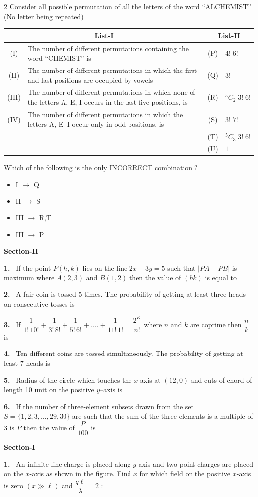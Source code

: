 \documentclass[10pt]{extarticle}
\newcommand{\papersec}[1]{\par\bigskip{\centering\Large\bfseries PAPER-#1\par}\medskip}
\newcommand{\partsec}[2]{\par\medskip\noindent{\large\bfseries PART-#1: #2}\par\smallskip}
\newcommand{\sect}[1]{\par\smallskip\noindent\textbf{#1}\par}
\newcommand{\qn}[1]{\par\smallskip\noindent\textbf{#1.}~}
\newenvironment{qoptions}{\begin{itemize}[leftmargin=1.8em,itemsep=1pt,topsep=2pt,label={}]}{\end{itemize}}
\newcommand{\opt}[2]{\item[(#1)] #2}
\begin{document}
\begin{multicols}{2}
Consider all possible permutation of all the letters of the word ``ALCHEMIST'' (No letter being repeated)
\begin{center}\small\setlength{\tabcolsep}{3pt}
\begin{tabular}{|c|p{3.7cm}|c|p{2.3cm}|}
\hline
\multicolumn{2}{|c|}{List-I} & \multicolumn{2}{c|}{List-II}\\ \hline
(I) & The number of different permutations containing the word ``CHEMIST'' is & (P) & $4!\;6!$\\ \hline
(II) & The number of different permutations in which the first and last positions are occupied by vowels & (Q) & $3!$\\ \hline
(III) & The number of different permutations in which none of the letters A, E, I occurs in the last five positions, is & (R) & $^5C_2\;3!\;6!$\\ \hline
(IV) & The number of different permutations in which the letters A, E, I occur only in odd positions, is & (S) & $3!\;7!$\\ \hline
 & & (T) & $^5C_3\;3!\;6!$\\ \hline
 & & (U) & $1$\\ \hline
\end{tabular}
\end{center}
Which of the following is the only INCORRECT combination ?
\begin{qoptions}
\opt{A}{I $\to$ Q}
\opt{B}{II $\to$ S}
\opt{C}{III $\to$ R,T}
\opt{D}{III $\to$ P}
\end{qoptions}
\sect{Section-II}
\qn{1} If the point $P(h,k)$ lies on the line $2x+3y=5$ such that $|PA-PB|$ is maximum where $A(2,3)$ and $B(1,2)$ then the value of $(hk)$ is equal to
\qn{2} A fair coin is tossed 5 times. The probability of getting at least three heads on consecutive tosses is
\qn{3} If $\dfrac{1}{1!\,10!}+\dfrac{1}{3!\,8!}+\dfrac{1}{5!\,6!}+\ldots.+\dfrac{1}{11!\,1!}=\dfrac{2^K}{n!}$ where $n$ and $k$ are coprime then $\dfrac{n}{k}$ is
\qn{4} Ten different coins are tossed simultaneously. The probability of getting at least 7 heads is
\qn{5} Radius of the circle which touches the $x$-axis at $(12,0)$ and cuts of chord of length 10 unit on the positive $y$--axis is
\qn{6} If the number of three-element subsets drawn from the set $S=\{1,2,3,\ldots,29,30\}$ are such that the sum of the three elements is a multiple of 3 is $P$ then the value of $\dfrac{P}{100}$ is
\papersec{2}
\partsec{1}{PHYSICS}
\sect{Section-I}
\qn{1} An infinite line charge is placed along $y$-axis and two point charges are placed on the $x$-axis as shown in the figure. Find $x$ for which field on the positive $x$-axis is zero $(x\gg\ell)$ and $\dfrac{q\ell}{\lambda}=2$ :

\end{multicols}
\end{document}
